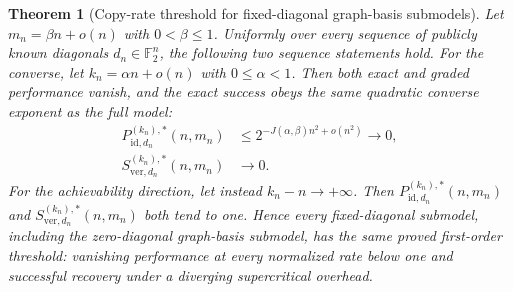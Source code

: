 \documentclass[11pt]{article}
\newcommand{\F}{\mathbb F}
\newcommand{\1}{\mathbf 1}
\theoremstyle{plain}
\newtheorem{theorem}{Theorem}[section]
\theoremstyle{definition}
\theoremstyle{remark}
\begin{document}
\begin{theorem}[Copy-rate threshold for fixed-diagonal graph-basis submodels]
\label{thm:fixed-diagonal-graph-basis-threshold}
Let $m_n=\beta n+o(n)$ with $0<\beta\le1$.  Uniformly over every
sequence of publicly known diagonals $d_n\in\F_2^n$, the following two
sequence statements hold.  For the converse, let
$k_n=\alpha n+o(n)$ with $0\le\alpha<1$.  Then both exact and graded
performance vanish, and the exact success obeys the same quadratic converse
exponent as the full model:
\begin{align}
 P_{\mathrm{id},d_n}^{(k_n),*}(n,m_n)
 &\le 2^{-J(\alpha,\beta)n^2+o(n^2)}\longrightarrow0,
 \label{eq:fixed-diagonal-exact-converse}\\
 S_{\mathrm{ver},d_n}^{(k_n),*}(n,m_n)&\longrightarrow0.
 \label{eq:fixed-diagonal-graded-converse}
\end{align}
For the achievability direction, let instead $k_n-n\to+\infty$.  Then
$P_{\mathrm{id},d_n}^{(k_n),*}(n,m_n)$ and
$S_{\mathrm{ver},d_n}^{(k_n),*}(n,m_n)$ both tend to one.  Hence every fixed-diagonal submodel, including the
zero-diagonal graph-basis submodel, has the same proved first-order threshold:
vanishing performance at every normalized rate below one and successful
recovery under a diverging supercritical overhead.
\end{theorem}
\end{document}
